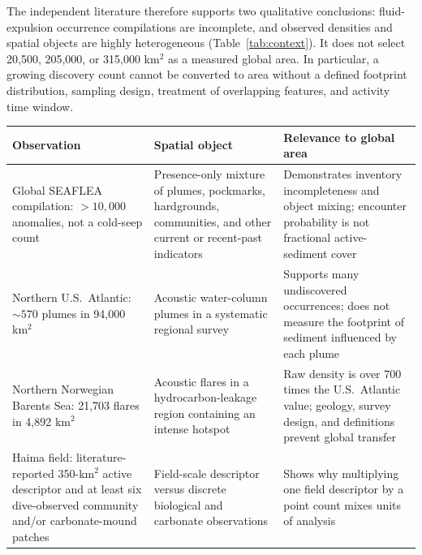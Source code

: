 \documentclass[11pt,letterpaper]{article}
\begin{document}
The independent literature therefore supports two qualitative conclusions: fluid-expulsion occurrence compilations are incomplete, and observed densities and spatial objects are highly heterogeneous (Table~\ref{tab:context}). It does not select 20,500, 205,000, or 315,000 km$^2$ as a measured global area. In particular, a growing discovery count cannot be converted to area without a defined footprint distribution, sampling design, treatment of overlapping features, and activity time window.

\begin{center}
\begin{minipage}{\textwidth}
\captionsetup{hypcap=false}
\label{tab:context}
\small
\begin{tabularx}{\textwidth}{@{}L{0.23\textwidth}L{0.27\textwidth}Y@{}}
\toprule
Observation & Spatial object & Relevance to global area \\
\midrule
Global SEAFLEA compilation: $>10{,}000$ anomalies, not a cold-seep count~\cite{phrampus2020} &
Presence-only mixture of plumes, pockmarks, hardgrounds, communities, and other current or recent-past indicators &
Demonstrates inventory incompleteness and object mixing; encounter probability is not fractional active-sediment cover \\
\addlinespace
Northern U.S.\ Atlantic: $\sim570$ plumes in 94,000 km$^2$~\cite{skarke2014} &
Acoustic water-column plumes in a systematic regional survey &
Supports many undiscovered occurrences; does not measure the footprint of sediment influenced by each plume \\
\addlinespace
Northern Norwegian Barents Sea: 21,703 flares in 4,892 km$^2$~\cite{serov2024} &
Acoustic flares in a hydrocarbon-leakage region containing an intense hotspot &
Raw density is over 700 times the U.S.\ Atlantic value; geology, survey design, and definitions prevent global transfer \\
\addlinespace
Haima field: literature-reported 350-km$^2$ active descriptor and at least six dive-observed community and/or carbonate-mound patches~\cite{yao2022,xu2020} &
Field-scale descriptor versus discrete biological and carbonate observations &
Shows why multiplying one field descriptor by a point count mixes units of analysis \\
\bottomrule
\end{tabularx}
\end{minipage}
\end{center}
\end{document}
